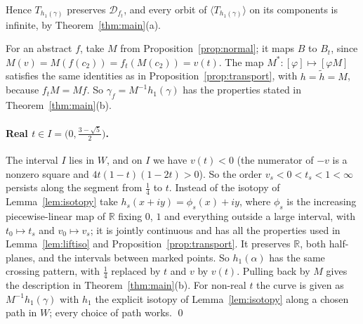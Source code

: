 \documentclass[11pt]{article}
\theoremstyle{definition}
\newcommand{\D}{\mathcal D}
\begin{document}
Hence $T_{h_1(\gamma)}$ preserves $\D_{f_t}$, and every orbit of $\langle T_{h_1(\gamma)}\rangle$ on its components is infinite, by Theorem~\ref{thm:main}(a).

For an abstract $f$, take $M$ from Proposition~\ref{prop:normal}; it maps $B$ to $B_t$, since $M(v)=M(f(c_2))=f_t(M(c_2))=v(t)$. The map $M^*\colon[\varphi]\mapsto[\varphi M]$ satisfies the same identities as in Proposition~\ref{prop:transport}, with $h=\tilde h=M$, because $f_tM=Mf$. So $\gamma_f=M^{-1}h_1(\gamma)$ has the properties stated in Theorem~\ref{thm:main}(b).

\paragraph{Real $t\in I=\bigl(0,\tfrac{3-\sqrt5}2\bigr)$.} The interval $I$ lies in $W$, and on $I$ we have $v(t)<0$ (the numerator of $-v$ is a nonzero square and $4t(1-t)(1-2t)>0$). So the order $v_s<0<t_s<1<\infty$ persists along the segment from $\tfrac14$ to $t$. Instead of the isotopy of Lemma~\ref{lem:isotopy} take $h_s(x+iy)=\phi_s(x)+iy$, where $\phi_s$ is the increasing piecewise-linear map of $\mathbb R$ fixing $0$, $1$ and everything outside a large interval, with $t_0\mapsto t_s$ and $v_0\mapsto v_s$; it is jointly continuous and has all the properties used in Lemma~\ref{lem:liftiso} and Proposition~\ref{prop:transport}. It preserves $\mathbb R$, both half-planes, and the intervals between marked points. So $h_1(\alpha)$ has the same crossing pattern, with $\tfrac14$ replaced by $t$ and $v$ by $v(t)$. Pulling back by $M$ gives the description in Theorem~\ref{thm:main}(b). For non-real $t$ the curve is given as $M^{-1}h_1(\gamma)$ with $h_1$ the explicit isotopy of Lemma~\ref{lem:isotopy} along a chosen path in $W$; every choice of path works. \qed
\end{document}
